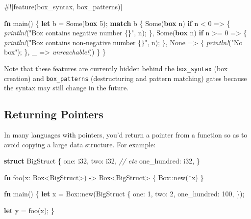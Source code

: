 \documentclass[a4paper,]{book}
\newenvironment{Shaded}{\begin{snugshade}}{\end{snugshade}}
\newcommand{\KeywordTok}[1]{\textcolor[rgb]{0.13,0.29,0.53}{\textbf{{#1}}}}
\newcommand{\DataTypeTok}[1]{\textcolor[rgb]{0.13,0.29,0.53}{{#1}}}
\newcommand{\DecValTok}[1]{\textcolor[rgb]{0.00,0.00,0.81}{{#1}}}
\newcommand{\ConstantTok}[1]{\textcolor[rgb]{0.00,0.00,0.00}{{#1}}}
\newcommand{\StringTok}[1]{\textcolor[rgb]{0.31,0.60,0.02}{{#1}}}
\newcommand{\CommentTok}[1]{\textcolor[rgb]{0.56,0.35,0.01}{\textit{{#1}}}}
\newcommand{\PreprocessorTok}[1]{\textcolor[rgb]{0.56,0.35,0.01}{\textit{{#1}}}}
\newcommand{\AttributeTok}[1]{\textcolor[rgb]{0.77,0.63,0.00}{{#1}}}
\newcommand{\NormalTok}[1]{{#1}}
\begin{document}
\begin{Shaded}
\begin{Highlighting}[]
\AttributeTok{#![}\NormalTok{feature}\AttributeTok{(}\NormalTok{box_syntax}\AttributeTok{,} \NormalTok{box_patterns}\AttributeTok{)]}

\KeywordTok{fn} \NormalTok{main() \{}
    \KeywordTok{let} \NormalTok{b = }\ConstantTok{Some}\NormalTok{(}\KeywordTok{box} \DecValTok{5}\NormalTok{);}
    \KeywordTok{match} \NormalTok{b \{}
        \ConstantTok{Some}\NormalTok{(}\KeywordTok{box} \NormalTok{n) }\KeywordTok{if} \NormalTok{n < }\DecValTok{0} \NormalTok{=> \{}
            \PreprocessorTok{println!}\NormalTok{(}\StringTok{"Box contains negative number \{\}"}\NormalTok{, n);}
        \NormalTok{\},}
        \ConstantTok{Some}\NormalTok{(}\KeywordTok{box} \NormalTok{n) }\KeywordTok{if} \NormalTok{n >= }\DecValTok{0} \NormalTok{=> \{}
            \PreprocessorTok{println!}\NormalTok{(}\StringTok{"Box contains non-negative number \{\}"}\NormalTok{, n);}
        \NormalTok{\},}
        \ConstantTok{None} \NormalTok{=> \{}
            \PreprocessorTok{println!}\NormalTok{(}\StringTok{"No box"}\NormalTok{);}
        \NormalTok{\},}
        \NormalTok{_ => }\PreprocessorTok{unreachable!}\NormalTok{()}
    \NormalTok{\}}
\NormalTok{\}}
\end{Highlighting}
\end{Shaded}

Note that these features are currently hidden behind the
\texttt{box\_syntax} (box creation) and \texttt{box\_patterns}
(destructuring and pattern matching) gates because the syntax may still
change in the future.

\subsection{Returning Pointers}\label{returning-pointers}

In many languages with pointers, you'd return a pointer from a function
so as to avoid copying a large data structure. For example:

\begin{Shaded}
\begin{Highlighting}[]
\KeywordTok{struct} \NormalTok{BigStruct \{}
    \NormalTok{one: }\DataTypeTok{i32}\NormalTok{,}
    \NormalTok{two: }\DataTypeTok{i32}\NormalTok{,}
    \CommentTok{// etc}
    \NormalTok{one_hundred: }\DataTypeTok{i32}\NormalTok{,}
\NormalTok{\}}

\KeywordTok{fn} \NormalTok{foo(x: }\DataTypeTok{Box}\NormalTok{<BigStruct>) -> }\DataTypeTok{Box}\NormalTok{<BigStruct> \{}
    \DataTypeTok{Box}\NormalTok{::new(*x)}
\NormalTok{\}}

\KeywordTok{fn} \NormalTok{main() \{}
    \KeywordTok{let} \NormalTok{x = }\DataTypeTok{Box}\NormalTok{::new(BigStruct \{}
        \NormalTok{one: }\DecValTok{1}\NormalTok{,}
        \NormalTok{two: }\DecValTok{2}\NormalTok{,}
        \NormalTok{one_hundred: }\DecValTok{100}\NormalTok{,}
    \NormalTok{\});}

    \KeywordTok{let} \NormalTok{y = foo(x);}
\NormalTok{\}}
\end{Highlighting}
\end{Shaded}
\end{document}
